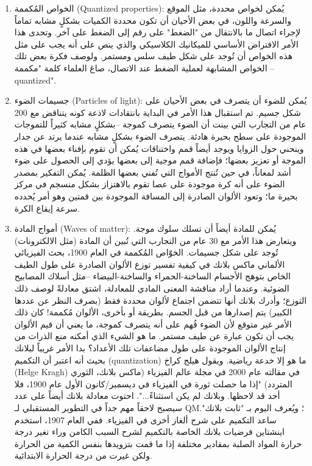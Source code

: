 \begin{enumerate}
	\item 


الخواص المُكممة (Quantized properties): يُمكن لخواص محددة، مثل الموقع والسرعة واللون، في بعض الأحيان أن تكون محددة الكميات بشكلٍ مشابه تماماً لإجراء اتصال ما بالانتقال من "الضغط" على رقم إلى الضغط على آخر. وتحدى هذا الأمر الافتراض الأساسي للميكانيك الكلاسيكي والذي ينص على أنه يجب على مثل هذه الخواص أن تُوجد على شكل طيف سلس ومستمر. ولوصف فكرة بعض تلك الخواص المشابهة لعملية الضغط عند الاتصال، صاغ العلماء كلمة "مكممة – quantized".

	\item 
جسيمات الضوء (Particles of light): يُمكن للضوء أن يتصرف في بعض الأحيان على شكل جسيم. تم استقبال هذا الأمر في البداية بانتقادات لاذعة كونه يتناقض مع 200 عام من التجارب التي بينت أن الضوء يتصرف كموجة –بشكلٍ مشابه كثيراً للتموجات الموجودة على سطح بحيرة هادئة. يتصرف الضوء بشكلٍ مشابه عندما يرتد عن جدار وينحني حول الزوايا ويوجد أيضاً قمم واختناقات يُمكن أن تقوم بإفناء بعضها في هذه الموجة أو تعزيز بعضها؛ فإضافة قمم موجية إلى بعضها يؤدي إلى الحصول على ضوء أشد لمعاناً، في حين تُنتج الأمواج التي تُفني بعضها الظلمة. يُمكن التفكير بمصدر الضوء على أنه كرة موجودة على عصا تقوم بالاهتزاز بشكل منسجم في مركز بحيرة ما؛ وتعود الألوان الصادرة إلى المسافة الموجودة بين قمتين وهو أمر يُحدده سرعة إيقاع الكرة.

	\item 
أمواج المادة (Waves of matter): يُمكن للمادة أيضاً أن تسلك سلوك موجة. ويتعارض هذا الأمر مع 30 عام من التجارب التي تُبين أن المادة (مثل الالكترونات) تُوجد على شكل جسيمات. الخوّاص المُكممة في العام 1900، بحث الفيزيائي الألماني ماكس بلانك في كيفية تفسير توزع الألوان الصادرة على طول الطيف الخاص بتوهج الأجسام الساخنة-الحمراء والساخنة-البيضاء –مثل أسلاك المصابيح الضوئية. وعندما أراد مناقشة المعنى المادي للمعادلة، اشتق معادلةً لوصف ذلك التوزع؛ وأدرك بلانك أنها تتضمن اجتماع لألوان محددة فقط (بصرف النظر عن عددها الكبير) يتم إصدارها من قبل الجسم. بطريقة أو بأخرى، الألوان مُكممة! كان ذلك الأمر غير متوقع لأن الضوء فُهم على أنه يتصرف كموجة، ما يعني أن قيم الألوان يجب أن تكون عبارة عن طيف مستمر. ما هو الشيء الذي أمكنه منع الذرات من إنتاج الألوان الموجودة على طول مضاعفات تلك الأعداد؟ بدا الأمر غريباً لبلانك بحيث أنه اعتبر أن التكميم (quantization) ما هو إلا خدعة رياضية. ويقول هيلج كراخ (Helge Kragh) في مقالته عام 2000 في مجلة عالم الفيزياء (ماكس بلانك، الثوري المتردد) "إذا ما حصلت ثورة في الفيزياء في ديسمبر/كانون الأول عام 1900، فلا أحد قد لاحظها. وبلانك لم يكن استثناءً...". احتوت معادلة بلانك أيضاً على عدد سيصبح لاحقاً مهم جداً في التطوير المستقبلي لـ QM؛ ويُعرف اليوم بـ "ثابت بلانك". ساعد التكميم على شرح ألغاز أخرى في الفيزياء. ففي العام 1907، استخدم اينشتاين فرضيات بلانك الخاصة بالتكميم لشرح السبب الكامن وراء تغير درجة حرارة المواد الصلبة بمقادير مختلفة إذا ما قمت بتزويدها بنفس الكمية من الحرارة ولكن غيرت من درجة الحرارة الابتدائية.
\end{enumerate} 
